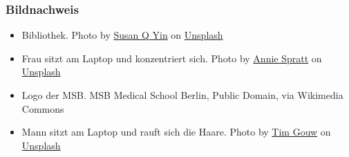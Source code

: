 \documentclass{beamer}
\begin{document}
\begin{frame}
\frametitle{Bildnachweis}


\begin{tiny}
 
\begin{itemize}

\item 
Bibliothek. Photo by \href{https://unsplash.com/@syinq?utm_content=creditCopyText&utm_medium=referral&utm_source=unsplash}{Susan Q Yin} on \href{https://unsplash.com/photos/books-on-brown-wooden-shelf-2JIvboGLeho?utm_content=creditCopyText&utm_medium=referral&utm_source=unsplash}{Unsplash}
  

\item 
Frau sitzt am Laptop und konzentriert sich. Photo by \href{https://unsplash.com/@anniespratt?utm_content=creditCopyText&utm_medium=referral&utm_source=unsplash}{Annie Spratt} on \href{https://unsplash.com/photos/woman-in-black-long-sleeve-shirt-using-macbook-air-on-brown-wooden-table-CV3nkG7XIwg?utm_content=creditCopyText&utm_medium=referral&utm_source=unsplash}{Unsplash}
  

  
\item
Logo der MSB. MSB Medical School Berlin, Public Domain, via Wikimedia Commons

\item 
Mann sitzt am Laptop und rauft sich die Haare. Photo by \href{https://unsplash.com/@punttim?utm_content=creditCopyText&utm_medium=referral&utm_source=unsplash}{Tim Gouw} on \href{https://unsplash.com/photos/man-wearing-white-top-using-macbook-1K9T5YiZ2WU?utm_content=creditCopyText&utm_medium=referral&utm_source=unsplash}{Unsplash}


\end{itemize}

\end{tiny}
\end{frame}
\end{document}
